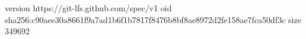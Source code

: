 version https://git-lfs.github.com/spec/v1
oid sha256:c90aee30a8661f9a7ad1b6f1b7817f8476b8bf8ae8972d2fe158ae7fca50df3c
size 349692
